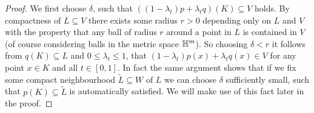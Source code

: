 \begin{proof}
    We first choose $\delta$, such that $((1-\lambda_t)p + \lambda_t q)(K) \subseteq V$ holds. By compactness of $L \subseteq V$ there exists some radius $r > 0$ depending only on $L$ and $V$ with the property that any ball of radius $r$ around a point in $L$ is contained in $V$ (of course considering balls in the metric space $\mathbb{H}^m$). So choosing $\delta < r$ it follows from $q(K) \subseteq L$ and $0 \leq \lambda_t \leq 1$, that $(1-\lambda_t)p(x) + \lambda_t q(x) \in V$ for any point $x \in K$ and all $t \in [0,1]$. In fact the same argument shows that if we fix some compact neighbourhood $\tilde{L} \subseteq W$ of $L$ we can choose $\delta$ sufficiently small, such that $p(K) \subseteq \tilde{L}$ is automatically satisfied. We will make use of this fact later in the proof. 
    

\end{proof}
